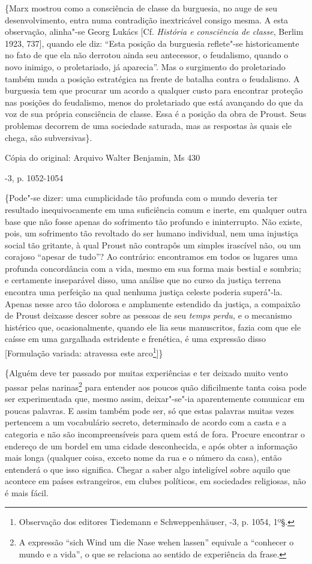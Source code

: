 \{Marx mostrou como a consciência de classe da burguesia, no auge de seu
desenvolvimento, entra numa contradição inextricável consigo mesma. A
esta observação, alinha"-se Georg Lukács {[}Cf. \emph{História e
consciência de classe}, Berlim 1923, 737{]}, quando ele diz: ``Esta
posição da burguesia reflete"-se historicamente no fato de que ela não
derrotou ainda seu antecessor, o feudalismo, quando o novo inimigo, o
proletariado, já aparecia''. Mas o surgimento do proletariado também
muda a posição estratégica na frente de batalha contra o feudalismo. A
burguesia tem que procurar um acordo a qualquer custo para encontrar
proteção nas posições do feudalismo, menos do proletariado que está
avançando do que da voz de sua própria consciência de classe. Essa é a
posição da obra de Proust. Seus problemas decorrem de uma sociedade
saturada, mas as respostas às quais ele chega, são subversivas\}.

Cópia do original: Arquivo Walter Benjamin, Ms 430

-3, p. 1052-1054

\{Pode"-se dizer: uma cumplicidade tão profunda com o mundo deveria ter
resultado inequivocamente em uma suficiência comum e inerte, em qualquer
outra base que não fosse apenas do sofrimento tão profundo e
ininterrupto. Não existe, pois, um sofrimento tão revoltado do ser
humano individual, nem uma injustiça social tão gritante, à qual Proust
não contrapôs um simples irascível não, ou um corajoso ``apesar de
tudo''? Ao contrário: encontramos em todos os lugares uma profunda
concordância com a vida, mesmo em sua forma mais bestial e sombria; e
certamente inseparável disso, uma análise que no curso da justiça
terrena encontra uma perfeição na qual nenhuma justiça celeste poderia
superá"-la. Apenas nesse arco tão dolorosa e amplamente estendido da
justiça, a compaixão de Proust deixasse descer sobre as pessoas de seu
\emph{temps perdu,} e o mecanismo histérico que, ocasionalmente, quando
ele lia seus manuscritos, fazia com que ele caísse em uma gargalhada
estridente e frenética, é uma expressão disso {[}Formulação variada:
atravessa este arco\footnote{Observação dos editores Tiedemann e
  Schweppenhäuser, -3, p. 1054, 1º§. \versal{[N. T.]}}{]}\}

\{Alguém deve ter passado por muitas experiências e ter deixado muito
vento passar pelas narinas\footnote{A expressão ``sich Wind um die
  Nase wehen lassen'' equivale a ``conhecer o mundo e a vida'', o que se
  relaciona ao sentido de experiência da frase. \versal{[N. T.]}} para entender aos
poucos quão dificilmente tanta coisa pode ser experimentada que, mesmo
assim, deixar"-se"-ia aparentemente comunicar em poucas palavras. E assim
também pode ser, só que estas palavras muitas vezes pertencem a um
vocabulário secreto, determinado de acordo com a casta e a categoria e
não são incompreensíveis para quem está de fora. Procure encontrar o
endereço de um bordel em uma cidade desconhecida, e após obter a
informação mais longa (qualquer coisa, exceto nome da rua e o número da
casa), então entenderá o que isso significa. Chegar a saber algo
inteligível sobre aquilo que acontece em países estrangeiros, em clubes
políticos, em sociedades religiosas, não é mais fácil.

